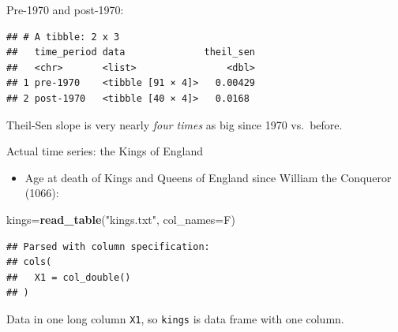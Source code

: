\documentclass[ignorenonframetext,]{beamer}
\newenvironment{Shaded}{\begin{snugshade}}{\end{snugshade}}
\newcommand{\DataTypeTok}[1]{\textcolor[rgb]{0.13,0.29,0.53}{#1}}
\newcommand{\DecValTok}[1]{\textcolor[rgb]{0.00,0.00,0.81}{#1}}
\newcommand{\KeywordTok}[1]{\textcolor[rgb]{0.13,0.29,0.53}{\textbf{#1}}}
\newcommand{\NormalTok}[1]{#1}
\newcommand{\OperatorTok}[1]{\textcolor[rgb]{0.81,0.36,0.00}{\textbf{#1}}}
\newcommand{\StringTok}[1]{\textcolor[rgb]{0.31,0.60,0.02}{#1}}
\providecommand{\tightlist}{%
  \setlength{\itemsep}{0pt}\setlength{\parskip}{0pt}}
\begin{document}
\begin{frame}[fragile]{Pre-1970 and post-1970:}
\protect\hypertarget{pre-1970-and-post-1970}{}

\begin{Shaded}
\end{Shaded}

\begin{verbatim}
## # A tibble: 2 x 3
##   time_period data              theil_sen
##   <chr>       <list>                <dbl>
## 1 pre-1970    <tibble [91 × 4]>   0.00429
## 2 post-1970   <tibble [40 × 4]>   0.0168
\end{verbatim}

Theil-Sen slope is very nearly \emph{four times} as big since 1970
vs.~before.

\end{frame}

\begin{frame}[fragile]{Actual time series: the Kings of England}
\protect\hypertarget{actual-time-series-the-kings-of-england}{}

\begin{itemize}
\tightlist
\item
  Age at death of Kings and Queens of England since William the
  Conqueror (1066):
\end{itemize}

\begin{Shaded}
\begin{Highlighting}[]
\NormalTok{kings=}\KeywordTok{read_table}\NormalTok{(}\StringTok{"kings.txt"}\NormalTok{, }\DataTypeTok{col_names=}\NormalTok{F)}
\end{Highlighting}
\end{Shaded}

\begin{verbatim}
## Parsed with column specification:
## cols(
##   X1 = col_double()
## )
\end{verbatim}

Data in one long column \texttt{X1}, so \texttt{kings} is data frame
with one column.

\end{frame}
\end{document}
